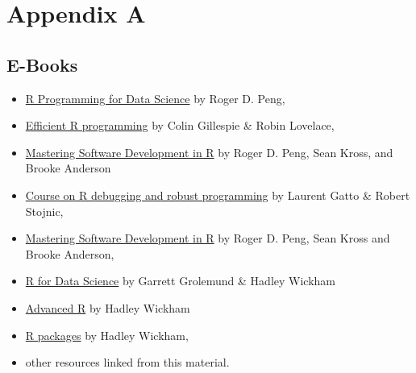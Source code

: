 \documentclass[]{book}
\providecommand{\tightlist}{%
  \setlength{\itemsep}{0pt}\setlength{\parskip}{0pt}}
\theoremstyle{definition}
\theoremstyle{definition}
\theoremstyle{definition}
\theoremstyle{remark}
\begin{document}
\chapter{Appendix A}\label{appendix-resources}

\section{E-Books}\label{e-books}

\begin{itemize}
\tightlist
\item
  \href{https://bookdown.org/rdpeng/rprogdatascience/}{R Programming for
  Data Science} by Roger D. Peng,
\item
  \href{https://bookdown.org/csgillespie/efficientR/}{Efficient R
  programming} by Colin Gillespie \& Robin Lovelace,
\item
  \href{https://bookdown.org/rdpeng/RProgDA/}{Mastering Software
  Development in R} by Roger D. Peng, Sean Kross, and Brooke Anderson
\item
  \href{https://github.com/lgatto/2016-02-25-adv-programming-EMBL}{Course
  on R debugging and robust programming} by Laurent Gatto \& Robert
  Stojnic,
\item
  \href{https://bookdown.org/rdpeng/RProgDA/}{Mastering Software
  Development in R} by Roger D. Peng, Sean Kross and Brooke Anderson,
\item
  \href{http://r4ds.had.co.nz/index.html}{R for Data Science} by Garrett
  Grolemund \& Hadley Wickham
\item
  \href{http://adv-r.had.co.nz/}{Advanced R} by Hadley Wickham
\item
  \href{http://r-pkgs.had.co.nz/}{R packages} by Hadley Wickham,
\item
  other resources linked from this material.
\end{itemize}


\end{document}
